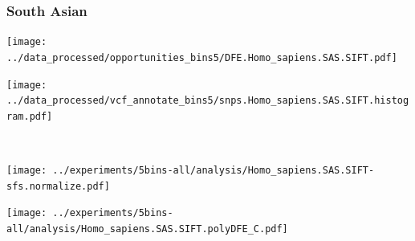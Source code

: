 \subsubsection{South Asian}

\begin{minipage}{0.49\linewidth}
    \texttt{[image: ../data\_processed/opportunities\_bins5/DFE.Homo\_sapiens.SAS.SIFT.pdf]}
\end{minipage}
\begin{minipage}{0.49\linewidth}
    \texttt{[image: ../data\_processed/vcf\_annotate\_bins5/snps.Homo\_sapiens.SAS.SIFT.histogram.pdf]}
\end{minipage}
\\
\begin{minipage}{0.49\linewidth}
    \texttt{[image: ../experiments/5bins-all/analysis/Homo\_sapiens.SAS.SIFT-sfs.normalize.pdf]}
\end{minipage}
\begin{minipage}{0.4\linewidth}
    \texttt{[image: ../experiments/5bins-all/analysis/Homo\_sapiens.SAS.SIFT.polyDFE\_C.pdf]}
\end{minipage}
